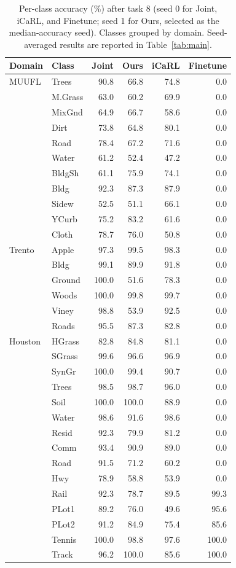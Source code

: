 \begin{table}[t]
\centering
\caption{Per-class accuracy (\%) after task 8 (seed 0 for Joint, iCaRL, and Finetune; seed 1 for Ours, selected as the median-accuracy seed). Classes grouped by domain. Seed-averaged results are reported in Table~\ref{tab:main}.}
\label{tab:perclass}
\scriptsize
\setlength{\tabcolsep}{2.5pt}
\begin{tabular}{llrrrr}
\toprule
Domain & Class & \textbf{Joint} & \textbf{Ours} & \textbf{iCaRL} & \textbf{Finetune} \\
\midrule
MUUFL & Trees & 90.8 & 66.8 & 74.8 & 0.0 \\
 & M.Grass & 63.0 & 60.2 & 69.9 & 0.0 \\
 & MixGnd & 64.9 & 66.7 & 58.6 & 0.0 \\
 & Dirt & 73.8 & 64.8 & 80.1 & 0.0 \\
 & Road & 78.4 & 67.2 & 71.6 & 0.0 \\
 & Water & 61.2 & 52.4 & 47.2 & 0.0 \\
 & BldgSh & 61.1 & 75.9 & 74.1 & 0.0 \\
 & Bldg & 92.3 & 87.3 & 87.9 & 0.0 \\
 & Sidew & 52.5 & 51.1 & 66.1 & 0.0 \\
 & YCurb & 75.2 & 83.2 & 61.6 & 0.0 \\
 & Cloth & 78.7 & 76.0 & 50.8 & 0.0 \\
\midrule
Trento & Apple & 97.3 & 99.5 & 98.3 & 0.0 \\
 & Bldg & 99.1 & 89.9 & 91.8 & 0.0 \\
 & Ground & 100.0 & 51.6 & 78.3 & 0.0 \\
 & Woods & 100.0 & 99.8 & 99.7 & 0.0 \\
 & Viney & 98.8 & 53.9 & 92.5 & 0.0 \\
 & Roads & 95.5 & 87.3 & 82.8 & 0.0 \\
\midrule
Houston & HGrass & 82.8 & 84.8 & 81.1 & 0.0 \\
 & SGrass & 99.6 & 96.6 & 96.9 & 0.0 \\
 & SynGr & 100.0 & 99.4 & 90.7 & 0.0 \\
 & Trees & 98.5 & 98.7 & 96.0 & 0.0 \\
 & Soil & 100.0 & 100.0 & 88.9 & 0.0 \\
 & Water & 98.6 & 91.6 & 98.6 & 0.0 \\
 & Resid & 92.3 & 79.9 & 81.2 & 0.0 \\
 & Comm & 93.4 & 90.9 & 89.0 & 0.0 \\
 & Road & 91.5 & 71.2 & 60.2 & 0.0 \\
 & Hwy & 78.9 & 58.8 & 53.9 & 0.0 \\
 & Rail & 92.3 & 78.7 & 89.5 & 99.3 \\
 & PLot1 & 89.2 & 76.0 & 49.6 & 95.6 \\
 & PLot2 & 91.2 & 84.9 & 75.4 & 85.6 \\
 & Tennis & 100.0 & 98.8 & 97.6 & 100.0 \\
 & Track & 96.2 & 100.0 & 85.6 & 100.0 \\
\bottomrule
\end{tabular}
\end{table}